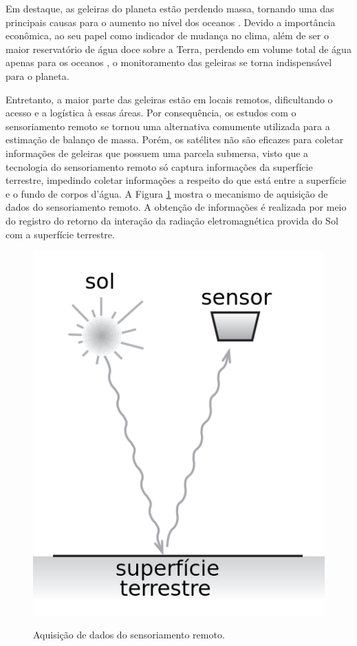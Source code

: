 Em destaque, as geleiras do planeta estão perdendo massa, tornando uma das principais causas para o aumento no nível dos oceanos \cite{rietbroek2016revisiting}. Devido a importância econômica, ao seu papel como indicador de mudança no clima, além de ser o maior reservatório de água doce sobre a Terra, perdendo em volume total de água apenas para os oceanos \cite{pinto2015crise}, o monitoramento das geleiras se torna indispensável para o planeta.

Entretanto, a maior parte das geleiras estão em locais remotos, dificultando o acesso e a logística à essas áreas. 
Por consequência, os estudos com o sensoriamento remoto se tornou uma alternativa comumente utilizada para a estimação de balanço de massa. 
Porém, os satélites não são eficazes para coletar informações de geleiras que possuem uma parcela submersa, visto que a tecnologia do sensoriamento remoto só captura informações da superfície terrestre, impedindo coletar informações a respeito do que está entre a superfície e o fundo de corpos d'água. 
A Figura \ref{fig:remote_sensor} mostra o mecanismo de aquisição de dados do sensoriamento remoto. A obtenção de informações é realizada por meio do registro do retorno da interação da radiação eletromagnética provida do Sol com a superfície terrestre. 

\begin{figure}[H]
    \centering
    \caption{Aquisição de dados do sensoriamento remoto.}
    \includegraphics[scale=0.5]{dados/figuras/remote_sensor.png}
    \label{fig:remote_sensor}
\end{figure}

